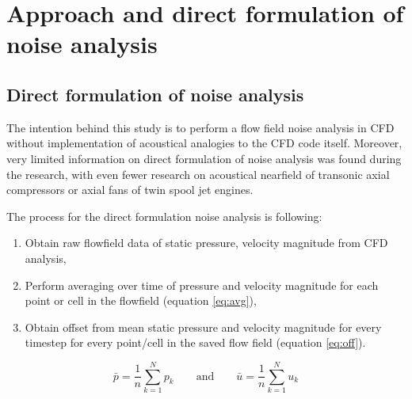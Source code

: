
\chapter{Approach and direct formulation of noise analysis} %
\label{approach} %


\section{Direct formulation of noise analysis} \label{direct_approach}
The intention behind this study is to perform a flow field noise analysis in CFD without implementation of acoustical analogies to the CFD code itself. Moreover, very limited information on direct formulation of noise analysis was found during the research, with even fewer research on acoustical nearfield of transonic axial compressors or axial fans of twin spool jet engines.

The process for the direct formulation noise analysis is following:
\begin{enumerate}
\item Obtain raw flowfield data of static pressure, velocity magnitude from CFD analysis,
\item Perform averaging over time of pressure and velocity magnitude for each point or cell in the flowfield (equation \ref{eq:avg}),
\item Obtain offset from mean static pressure and velocity magnitude for every timestep for every point/cell in the saved flow field (equation \ref{eq:off}).		
\end{enumerate}


\begin{equation} \label{eq:avg}
\bar{p} = \frac{1}{n} \sum_{k=1}^{N} p_k \qquad \text{and} \qquad \bar{u} = \frac{1}{n} \sum_{k=1}^{N} u_k
\end{equation}

